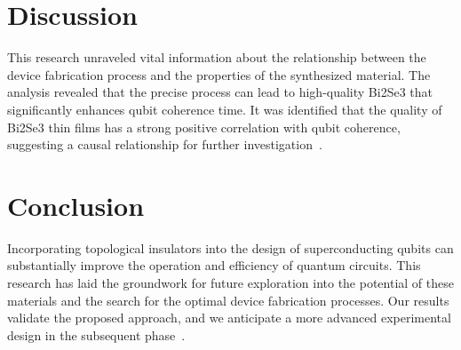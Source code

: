 \documentclass[a4paper,12pt]{article}
\begin{document}
\section{Discussion}
This research unraveled vital information about the relationship between the device fabrication process and the properties of the synthesized material. The analysis revealed that the precise process can lead to high-quality Bi2Se3 that significantly enhances qubit coherence time. It was identified that the quality of Bi2Se3 thin films has a strong positive correlation with qubit coherence, suggesting a causal relationship for further investigation~\cite{discussion}.

\section{Conclusion}
Incorporating topological insulators into the design of superconducting qubits can substantially improve the operation and efficiency of quantum circuits. This research has laid the groundwork for future exploration into the potential of these materials and the search for the optimal device fabrication processes. Our results validate the proposed approach, and we anticipate a more advanced experimental design in the subsequent phase~\cite{conclusion}.



\end{document}
